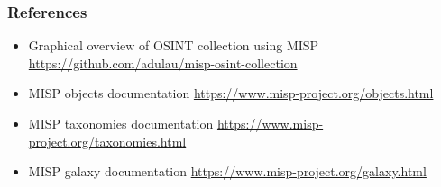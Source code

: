 \begin{frame}
        \frametitle{References}
        \begin{itemize}
        \item Graphical overview of OSINT collection using MISP \url{https://github.com/adulau/misp-osint-collection}
        \item MISP objects documentation \url{https://www.misp-project.org/objects.html}
        \item MISP taxonomies documentation \url{https://www.misp-project.org/taxonomies.html}
        \item MISP galaxy documentation \url{https://www.misp-project.org/galaxy.html}
        \end{itemize}
\end{frame}

